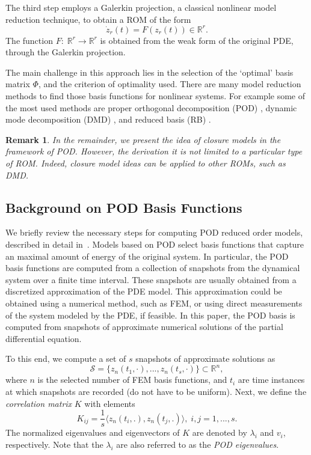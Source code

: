 \documentclass[letterpaper,conference,onecolumn,11pt]{IEEEtran}
\newtheorem{remark}{Remark}
\begin{document}
The third step employs a Galerkin projection, a classical nonlinear
model reduction technique,  to obtain a ROM of the form
\begin{equation}\label{ROM1_chap3}
\dot{z}_r(t) =F(z_r(t)) \in \mathbb{R}^r.
\end{equation}
The function $F:\;\mathbb{R}^r \rightarrow \mathbb{R}^r$ is obtained
from the weak form of the original PDE, through the Galerkin
projection.

The main challenge in this approach lies in the selection of the
`optimal' basis matrix $\Phi$, and the criterion of optimality
used. There are many model reduction methods to find those basis
functions for nonlinear systems. For example some of the most used
methods are proper orthogonal decomposition (POD) \cite{KV02}, dynamic
mode decomposition (DMD) \cite{KGBBN15}, and reduced basis (RB)
\cite{veroy2005certified}.

\begin{remark}
    In the remainder, we present the idea of closure models in the
    framework of POD. However, the derivation it is not limited to a
    particular type of ROM. Indeed, closure model ideas can be applied
    to other ROMs, such as DMD.
\end{remark}


\subsection{Background on POD Basis Functions}
\label{basic_pod_chap3}
We briefly review the necessary steps for computing POD reduced order
models, described in detail in~\cite{KV02,HLB98}. Models based on POD
select basis functions that capture an maximal amount of energy of the
original system. In particular, the POD basis functions are computed
from a collection of snapshots from the dynamical system over a finite
time interval. These snapshots are usually obtained from a discretized
approximation of the PDE model. This approximation could be obtained
using a numerical method, such as FEM, or using direct measurements of
the system modeled by the PDE, if feasible. In this paper, the POD
basis is computed from snapshots of approximate numerical solutions of
the partial differential equation.

To this end, we compute a set of $s$ snapshots of approximate
solutions as
\begin{equation}\label{snap_shot_set_chap3}
\mathcal{S} =\{z_{n}(t_{1},\cdot),...,z_{n}(t_{s},\cdot)\}\subset\mathbb{R}^n,
\end{equation}
where $n$ is the selected number of FEM basis functions, and $t_i$ are
time instances at which snapshots are recorded (do not have to be
uniform). Next, we define the \textit{correlation matrix} $K$ with
elements
\begin{equation}\label{correlation_matrix_pod_chap3}
{K}_{ij}=\frac{1}{s}\langle z_{n}(t_{i},.),z_{n}(t_{j},.)\rangle ,\;i,j=1,...,s.
\end{equation}
The normalized eigenvalues and eigenvectors of $K$ are denoted by
$\lambda_i$ and $v_i$, respectively. Note that the $\lambda_i$ are
also referred to as the \textit{POD eigenvalues}.
\end{document}
